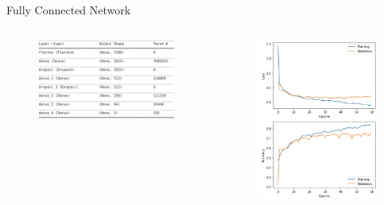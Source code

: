 \documentclass[aspectratio=1610, 9pt]{beamer}
\begin{document}
\begin{frame}{Fully Connected Network}
  \begin{columns}
    \begin{column}{0.48 \textwidth }
      \begin{figure}
        \centering
        \includegraphics[width = 0.8\textwidth]{images/NN.png}
      \end{figure}
    \end{column}
    \begin{column}{0.48 \textwidth }
      \centering
      \includegraphics[width = 0.8\textwidth]{images/History.png}
    \end{column}
  \end{columns}
\end{frame}
\end{document}
